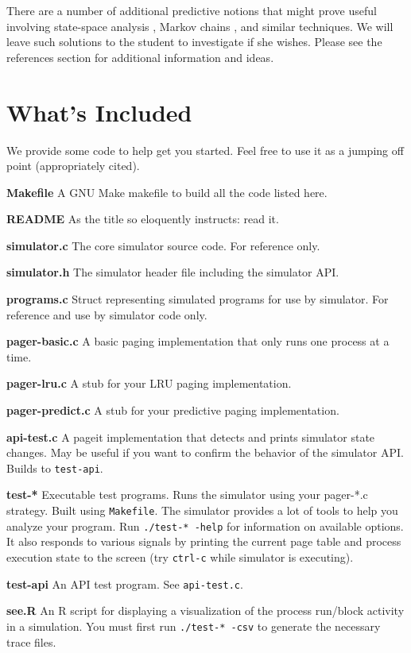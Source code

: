 \documentclass[12pt]{article}
\newenvironment{packed_enum}{
\begin{enumerate}
  \setlength{\itemsep}{1pt}
  \setlength{\parskip}{0pt}
  \setlength{\parsep}{0pt}
}{\end{enumerate}}
\begin{document}
There are a number of additional predictive notions that might prove
useful involving state-space analysis \cite{wiki-statespace}, Markov
chains \cite{wiki-markov},  and similar techniques.
We will leave such solutions to the student to investigate if she
wishes. Please see the references section for additional information
and ideas.

\section{What's Included}

We provide some code to help get you started. Feel free to use it as a
jumping off point (appropriately cited).

\begin{packed_enum}
\item {\bf Makefile} A GNU Make makefile to build all the code listed
  here.
\item {\bf README} As the title so eloquently instructs: read it.
\item {\bf simulator.c} The core simulator source code. For reference
  only.
\item {\bf simulator.h} The simulator header file including the simulator
  API.
\item {\bf programs.c} Struct representing simulated programs for use
  by simulator. For reference and use by simulator code only.
\item {\bf pager-basic.c} A basic paging implementation that only runs
  one process at a time.
\item {\bf pager-lru.c} A stub for your LRU paging implementation.
\item {\bf pager-predict.c} A stub for your predictive paging implementation.
\item {\bf api-test.c} A pageit implementation that detects and prints
  simulator state changes. May be useful if you want to confirm the
  behavior of the simulator API. Builds to \texttt{test-api}.
\item {\bf test-*} Executable test programs. Runs the simulator using
  your pager-*.c strategy. Built using \texttt{Makefile}. The simulator
  provides a lot of tools to help you analyze your program.
  Run \texttt{./test-* -help} for information on available options. It
  also responds to various signals by printing the current page table
  and process execution state to the screen (try \texttt{ctrl-c} while
  simulator is executing).
\item {\bf test-api} An API test program. See \texttt{api-test.c}.
\item {\bf see.R} An R script for displaying a visualization of the
  process run/block activity in a simulation.
  You must first run \texttt{./test-* -csv} to
  generate the necessary trace files. \\
  

\end{packed_enum}
\end{document}
